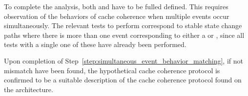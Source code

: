 \begin{step}
\label{step:simultaneous_event_behavior_matching}
To complete the analysis, both \archmonitorval{} and \obsreachfun{} have to
be fulled defined. This requires observation of the behaviors of cache coherence
when multiple events occur simultaneously. The relevant tests to perform
correspond to stable state change paths where there is more than one
event corresponding to either a \instructions{} or \querymessages{}, since all
tests with a single one of these have already been performed.
\end{step}

Upon completion of Step~\ref{step:simultaneous_event_behavior_matching}, if not
mismatch have been found, the hypothetical cache coherence protocol is confirmed
to be a suitable description of the cache coherence protocol found on the
architecture.
